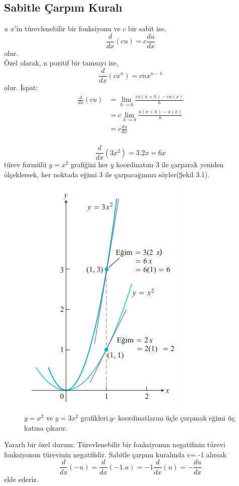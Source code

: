 \subsection{\protect Sabitle Çarpım Kuralı}
$u$ $x$'in türevlenebilir bir fonksiyonu ve $c$ bir sabit ise,
	\begin{equation*}
		\frac{d}{dx}(cu) = c \frac{du}{dx}
	\end{equation*}
olur.\\
Özel olarak, n pozitif bir tamsayı ise,
	\begin{equation*}
		\frac{d}{dx}(cx^n) = cnx^{n-1}
	\end{equation*}
olur. İspat: 
	\begin{equation*}
	\begin{split}
		\frac{d}{dx}(cu)&=\lim_{h \rightarrow 0}\frac{cu(x+h)-cu(x)}{h} \\
		&=c\lim_{h \rightarrow 0}\frac{u(x+h)-u(x)}{h}\\
		&=c \frac{du}{dx}\\
	\end{split}
	\end{equation*}
\begin{ornek}
	\begin{equation*}
	\frac{d}{dx}(3x^2)=3.2x=6x
	\end{equation*}
türev formülü $y=x^2$ grafiğini her $y$ koordinatını 3 ile çarparak yeniden ölçeklersek, her noktada eğimi 3 ile çarpacağımızı söyler(Şekil 3.1).
\begin{figure}[H]
	\centering
	\includegraphics[width=0.5\linewidth]{kural3.png}
	\caption{$y=x^2$ ve $y=3x^2$ grafikleri.$y$- koordinatlarını üçle çarpmak eğimi üç katına çıkarır.}
	\label{fig:ornekresim}
\end{figure}
Yararlı bir özel durum: Türevlenebilir bir fonksiyonun negatifinin türevi fonksiyonun türevinin negatifidir. Sabitle çarpım kuralında c= -1 alırsak
	\begin{equation*}
	\frac{d}{dx}(-u)=\frac{d}{dx}(-1.u)=-1\frac{d}{dx}(u) = -\frac{du}{dx}
	\end{equation*}
elde ederiz.
\end{ornek}
